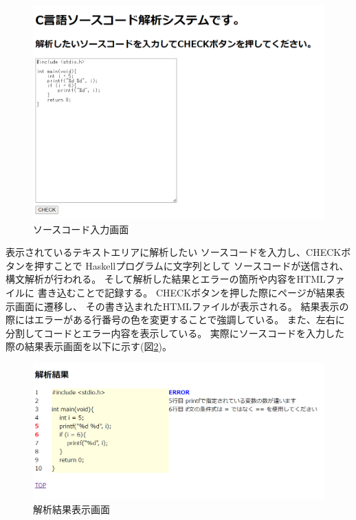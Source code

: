\documentclass{csspaper}
\begin{document}
      \begin{figure}[p]
         \centering
         \includegraphics[width=13cm]{systempage1.png}
         \caption{ソースコード入力画面}
         \label{fig:sys1}
      \end{figure}

      表示されているテキストエリアに解析したい
      ソースコードを入力し、CHECKボタンを押すことで
      Haskellプログラムに文字列として
      ソースコードが送信され、構文解析が行われる。
      そして解析した結果とエラーの箇所や内容をHTMLファイルに
      書き込むことで記録する。
      CHECKボタンを押した際にページが結果表示画面に遷移し、
      その書き込まれたHTMLファイルが表示される。
      結果表示の際にはエラーがある行番号の色を変更することで強調している。
      また、左右に分割してコードとエラー内容を表示している。
      実際にソースコードを入力した際の結果表示画面を以下に示す(図\ref{fig:sys2})。

      \begin{figure}[h]
         \centering
         \includegraphics[width=14cm]{systempage2.png}
         \caption{解析結果表示画面}
         \label{fig:sys2}
      \end{figure}
\end{document}
